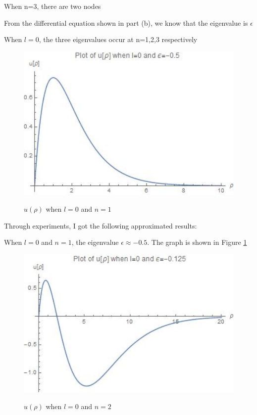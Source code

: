 \documentclass[12pt]{article}
\begin{document}
\begin{spacing}{2.0}
When n=3, there are two nodes

From the differential equation shown in part (b), we know that the eigenvalue is $\epsilon$

When $l=0$, the three eigenvalues occur at n=1,2,3 respectively\\

\begin{figure}
  \centering
  \includegraphics[width=4.5in]{out4}\\
  \caption{$u(\rho)$ when $l=0$ and $n=1$}\label{out4}
\end{figure}

Through experiments, I got the following approximated results:

When $l=0$ and $n=1$, the eigenvalue $\epsilon \approx -0.5$. The graph is shown in Figure \ref{out4}

\begin{figure}
  \centering
  \includegraphics[width=4.5in]{out5}\\
  \caption{$u(\rho)$ when $l=0$ and $n=2$}\label{out5}
\end{figure}


\end{spacing}
\end{document}
